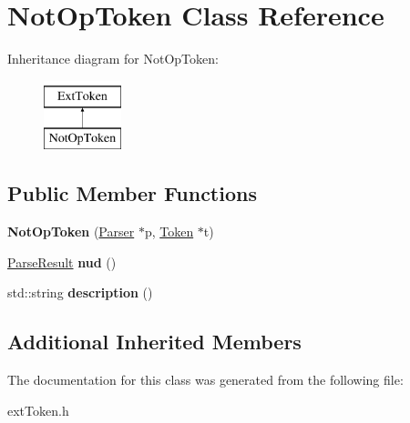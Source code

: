\hypertarget{classNotOpToken}{\section{Not\-Op\-Token Class Reference}
\label{classNotOpToken}
}
Inheritance diagram for Not\-Op\-Token\-:\begin{figure}[H]
\begin{center}
\leavevmode
\includegraphics[height=2.000000cm]{classNotOpToken}
\end{center}
\end{figure}
\subsection*{Public Member Functions}
\begin{DoxyCompactItemize}
\item 
\hypertarget{classNotOpToken_afb8b9e96a178b1dfd69abf0a901dfddf}{{\bfseries Not\-Op\-Token} (\hyperlink{classParser}{Parser} $\ast$p, \hyperlink{classToken}{Token} $\ast$t)}\label{classNotOpToken_afb8b9e96a178b1dfd69abf0a901dfddf}

\item 
\hypertarget{classNotOpToken_a55a0dd53742aaca04338c16be079b031}{\hyperlink{classParseResult}{Parse\-Result} {\bfseries nud} ()}\label{classNotOpToken_a55a0dd53742aaca04338c16be079b031}

\item 
\hypertarget{classNotOpToken_a136a11f1e42542a9a58b7c14249c9d23}{std\-::string {\bfseries description} ()}\label{classNotOpToken_a136a11f1e42542a9a58b7c14249c9d23}

\end{DoxyCompactItemize}
\subsection*{Additional Inherited Members}


The documentation for this class was generated from the following file\-:\begin{DoxyCompactItemize}
\item 
ext\-Token.\-h\end{DoxyCompactItemize}
